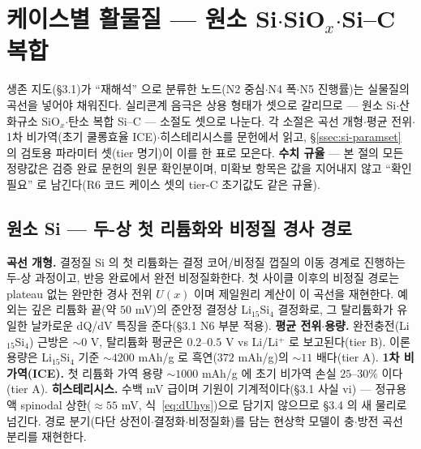 \section{케이스별 활물질 --- 원소 Si$\cdot$SiO$_x$$\cdot$Si--C 복합}\label{sec:si-cases}
생존 지도(§3.1)가 ``재해석'' 으로 분류한 노드(N2 중심$\cdot$N4 폭$\cdot$N5 진행률)는 실물질의
곡선을 넣어야 채워진다. 실리콘계 음극은 상용 형태가 셋으로 갈리므로 --- 원소 Si$\cdot$산화규소
SiO$_x$$\cdot$탄소 복합 Si--C --- 소절도 셋으로 나눈다. 각 소절은 곡선 개형$\cdot$평균 전위$\cdot$1차
비가역(초기 쿨롱효율 ICE)$\cdot$히스테리시스를 문헌에서 읽고, \S\ref{ssec:si-paramset} 의 검토용 파라미터
셋(tier 명기)이 이를 한 표로 모은다. \textbf{수치 규율} --- 본 절의 모든 정량값은 검증 완료 문헌의 원문
확인분이며, 미확보 항목은 값을 지어내지 않고 ``확인 필요'' 로 남긴다(R6 코드 케이스 셋의 tier-C 초기값도
같은 규율).

\subsection{원소 Si --- 두-상 첫 리튬화와 비정질 경사 경로}\label{ssec:si-elem}
\textbf{곡선 개형.} 결정질 Si 의 첫 리튬화는 결정 코어/비정질 껍질의 이동 경계로 진행하는 두-상
과정이고\cite{limthongkul2003}, 반응 완료에서 완전 비정질화한다\cite{li_dahn2007}. 첫 사이클 이후의
비정질 경로는 plateau 없는 완만한 경사 전위 $U(x)$ 이며 제일원리 계산이 이 곡선을
재현한다\cite{chevrier_dahn2009}. 예외는 깊은 리튬화 끝(약 $50$ mV)의 준안정 결정상 Li$_{15}$Si$_4$
결정화로\cite{obrovac_christensen2004}, 그 탈리튬화가 유일한 날카로운 dQ/dV 특징을 준다(§3.1 N6 부분
적용). \textbf{평균 전위$\cdot$용량.} 완전충전(Li$_{15}$Si$_4$) 근방은 $\sim0$ V, 탈리튬화 평균은
$0.2$--$0.5$ V vs Li/Li$^+$ 로 보고된다(tier B\cite{obrovac_chevrier2014}). 이론 용량은
Li$_{15}$Si$_4$ 기준 $\sim4200$ mAh/g 로 흑연($372$ mAh/g)의 $\sim11$ 배다(tier A\cite{wen_huggins1981}).
\textbf{1차 비가역(ICE).} 첫 리튬화 가역 용량 $\sim1000$ mAh/g 에 초기 비가역 손실 $25$--$30\%$ 이다(tier
A\cite{limthongkul2003}). \textbf{히스테리시스.} 수백 mV 급이며 기원이 기계적이다(§3.1 사실 vi) ---
정규용액 spinodal 상한($\approx55$ mV, 식~\eqref{eq:dUhys})으로 담기지 않으므로 §3.4 의 새 물리로 넘긴다.
경로 분기(다단 상전이$\cdot$결정화$\cdot$비정질화)를 담는 현상학 모델이 충$\cdot$방전 곡선 분리를
재현한다\cite{jiang_sihys2020}.

